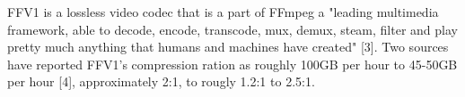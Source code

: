 \documentclass[letterpaper,10pt,onecolumn,draftclsnofoot]{IEEEtran}
\begin{document}
FFV1 is a lossless video codec that is a part of FFmpeg a "leading multimedia framework, able to decode, encode, transcode, mux, demux, steam, filter and play pretty much anything that humans and machines have created" [3].
Two sources have reported FFV1's compression ration as roughly 100GB per hour to 45-50GB per hour [4], approximately 2:1, to rougly 1.2:1 to 2.5:1.




\end{document}

